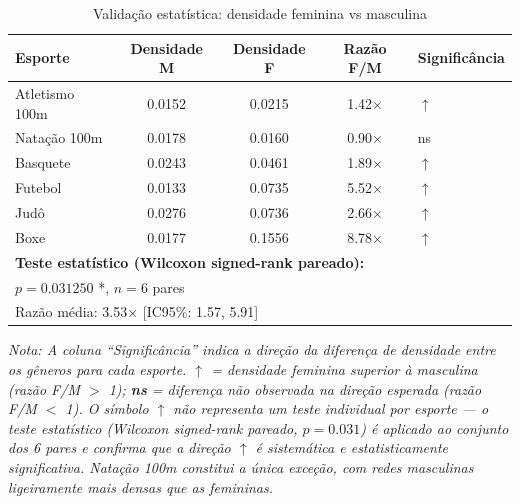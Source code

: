 \begin{table}[h]
\centering
\caption{Validação estatística: densidade feminina vs masculina}
\label{tab:statistical_validation_density}
\small
\begin{tabular}{lcccl}
\hline
\textbf{Esporte} & \textbf{Densidade M} & \textbf{Densidade F} & \textbf{Razão F/M} & \textbf{Significância} \\
\hline
Atletismo 100m & 0.0152 & 0.0215 & 1.42× & $\uparrow$ \\
Natação 100m & 0.0178 & 0.0160 & 0.90× & ns \\
Basquete & 0.0243 & 0.0461 & 1.89× & $\uparrow$ \\
Futebol & 0.0133 & 0.0735 & 5.52× & $\uparrow$ \\
Judô & 0.0276 & 0.0736 & 2.66× & $\uparrow$ \\
Boxe & 0.0177 & 0.1556 & 8.78× & $\uparrow$ \\
\hline
\multicolumn{5}{l}{\textbf{Teste estatístico (Wilcoxon signed-rank pareado):}} \\
\multicolumn{5}{l}{$p = 0.031250$ *, $n = 6$ pares} \\
\multicolumn{5}{l}{Razão média: 3.53× [IC95\%: 1.57, 5.91]} \\
\hline
\end{tabular}

\vspace{0.3cm}

\footnotesize
\textit{Nota: A coluna ``Significância'' indica a direção da diferença de densidade entre os gêneros para cada esporte. $\uparrow$ = densidade feminina superior à masculina (razão F/M $>$ 1); \textbf{ns} = diferença não observada na direção esperada (razão F/M $<$ 1). O símbolo $\uparrow$ não representa um teste individual por esporte --- o teste estatístico (Wilcoxon signed-rank pareado, $p = 0.031$) é aplicado ao conjunto dos 6 pares e confirma que a direção $\uparrow$ é sistemática e estatisticamente significativa. Natação 100m constitui a única exceção, com redes masculinas ligeiramente mais densas que as femininas.}
\end{table}
